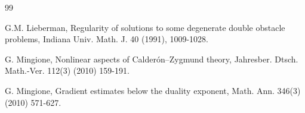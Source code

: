 \documentclass[10pt,a4paper]{article}
\theoremstyle{definition}
\numberwithin{equation}{section}
\begin{document}
\begin{thebibliography}{99}








  G.M.  Lieberman,  Regularity of solutions to some degenerate double obstacle problems,  Indiana Univ. Math. J. 40 (1991), 1009-1028.



 G. Mingione, Nonlinear aspects of Calder\'on–Zygmund theory, Jahresber. Dtsch.
 Math.-Ver. 112(3) (2010) 159-191.
 
 G. Mingione, Gradient estimates below the duality exponent, Math. Ann. 346(3)
(2010) 571-627.



\end{thebibliography}
\end{document}
